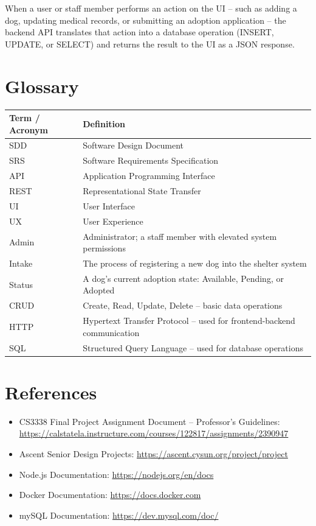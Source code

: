 \documentclass[12pt]{article}
\begin{document}
When a user or staff member performs an action on the UI -- such as adding a dog, updating
medical records, or submitting an adoption application -- the backend API translates that
action into a database operation (INSERT, UPDATE, or SELECT) and returns the result to
the UI as a JSON response.

\section{Glossary}
 
\begin{center}
\begin{tabular}{|l|p{9.5cm}|}
    \hline
    \rowcolor{shelterblue!15}
    \textbf{Term / Acronym} & \textbf{Definition} \\
    \hline
    SDD    & Software Design Document \\
    \hline
    SRS    & Software Requirements Specification \\
    \hline
    API    & Application Programming Interface \\
    \hline
    REST   & Representational State Transfer \\
    \hline
    UI     & User Interface \\
    \hline
    UX     & User Experience \\
    \hline
    Admin  & Administrator; a staff member with elevated system permissions \\
    \hline
    Intake & The process of registering a new dog into the shelter system \\
    \hline
    Status & A dog's current adoption state: Available, Pending, or Adopted \\
    \hline
    CRUD   & Create, Read, Update, Delete -- basic data operations \\
    \hline
    HTTP   & Hypertext Transfer Protocol -- used for frontend-backend communication \\
    \hline
    SQL    & Structured Query Language -- used for database operations \\
    \hline
\end{tabular}
\end{center}
 
\section{References}
\begin{itemize}
    \item CS3338 Final Project Assignment Document -- Professor's Guidelines: \url{https://calstatela.instructure.com/courses/122817/assignments/2390947}
    \item Ascent Senior Design Projects:
    \url{https://ascent.cysun.org/project/project}
    \item Node.js Documentation:
    \url{https://nodejs.org/en/docs}
    \item Docker Documentation:
    \url{https://docs.docker.com}
    \item mySQL Documentation:
    \url{https://dev.mysql.com/doc/}
\end{itemize}
 
\end{document}
